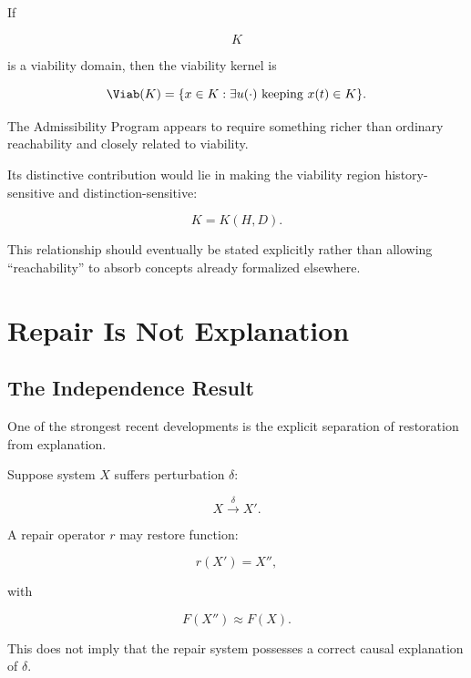 \documentclass[11pt]{article}
\theoremstyle{remark}
\begin{document}
If

\begin{equation}
K
\end{equation}

is a viability domain, then the viability kernel is

\begin{equation}
\Viab(K)
=
\{
x\in K:
\exists u(\cdot)
\text{ keeping }
x(t)\in K
\}.
\end{equation}

The Admissibility Program appears to require something richer than ordinary reachability and closely related to viability.

Its distinctive contribution would lie in making the viability region history-sensitive and distinction-sensitive:

\begin{equation}
K
=
K(H,D).
\end{equation}

This relationship should eventually be stated explicitly rather than allowing ``reachability'' to absorb concepts already formalized elsewhere.

\section{Repair Is Not Explanation}

\subsection{The Independence Result}

One of the strongest recent developments is the explicit separation of restoration from explanation.

Suppose system $X$ suffers perturbation $\delta$:

\begin{equation}
X
\xrightarrow{\delta}
X'.
\end{equation}

A repair operator $r$ may restore function:

\begin{equation}
r(X')
=
X'',
\end{equation}

with

\begin{equation}
F(X'')\approx F(X).
\end{equation}

This does not imply that the repair system possesses a correct causal explanation of $\delta$.
\end{document}
